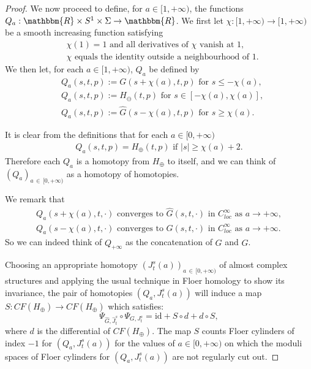 \documentclass[AHL,Unicode,longabstracts,published]{cedram}
\newcommand{\R}{\mathbbm{R}}
\newcommand{\rid}{\mathrm{id}}
\begin{document}
\begin{proof}
We now proceed to define, for $a \in [1,+\infty)$, the functions $Q_a: \R \times S^1 \times \Sigma \to \R$. We first let $\chi:[1,+\infty) \to [1,+\infty)$ be a smooth increasing function satisfying
\begin{align}
&\chi(1)=1 \text{ and all derivatives of } \chi \text{ vanish at } 1, \\
&\chi \text{ equals the identity outside a neighbourhood of } 1.
\end{align}
We then let, for each $a\in [1,+\infty)$, $Q_a$ be defined by
\begin{align}\label{eq:Qabig}
&Q_a(s,t,p) := G(s+\chi(a),t,p) \text{ for } s \leq -\chi(a), \\
&Q_a(s,t,p) := H_\ominus(t,p) \text{ for } s \in [-\chi(a),\chi(a)], \\
&Q_a(s,t,p) := \widehat{G}(s-\chi(a),t,p) \text{ for } s \geq \chi(a).
\end{align}

It is clear from the definitions that for each $a\in [0,+\infty)$
\begin{align}
Q_a(s,t,p) = H_\oplus(t,p) \text{ if } |s| \geq \chi(a) +2.
\end{align}
Therefore each $Q_a$ is a homotopy from $H_\oplus$ to itself, and we can think of $(Q_a)_{a\,\in\,[0,+\infty)}$ as a homotopy of homotopies.

We remark that
\begin{align}
Q_a(s + \chi(a),t,\cdot) \text{ converges to } \widehat{G}(s,t, \cdot) \text{ in } C^\infty_{loc} \text{ as } a \to +\infty,\label{eq:convergenceatinfty} \\
Q_a(s - \chi(a),t, \cdot) \text{ converges to } G(s,t,\cdot) \text{ in } C^\infty_{loc} \text{ as } a \to +\infty.\label{eq:convergenceatinfty2}
\end{align}
So we can indeed think of $Q_{+\infty}$ as the concatenation of $G$ and $\widehat G$.

Choosing an appropriate homotopy $(J^s_t(a))_{a\, \in\,[0,+\infty)}$ of almost complex structures and applying the usual technique in Floer homology to show its invariance, the pair of homotopies $(Q_a,J^s_t(a))$ will induce a map $S: CF(H_\oplus) \to CF(H_\oplus)$ which satisfies:
\[
\Psi_{\widehat{G},\widehat{J}^s_t}\circ \Psi_{G,J^s_t} = \rid + S\circ d + d \circ S,
\]
where $d$ is the differential of $CF(H_\oplus)$. The map $S$ counts Floer cylinders of index $-1$ for $(Q_a,J^s_t(a))$ for the values of $a\in [0,+\infty)$ on which the moduli spaces of Floer cylinders for $(Q_a,J^s_t(a))$ are not regularly cut out.


\end{proof}
\end{document}
